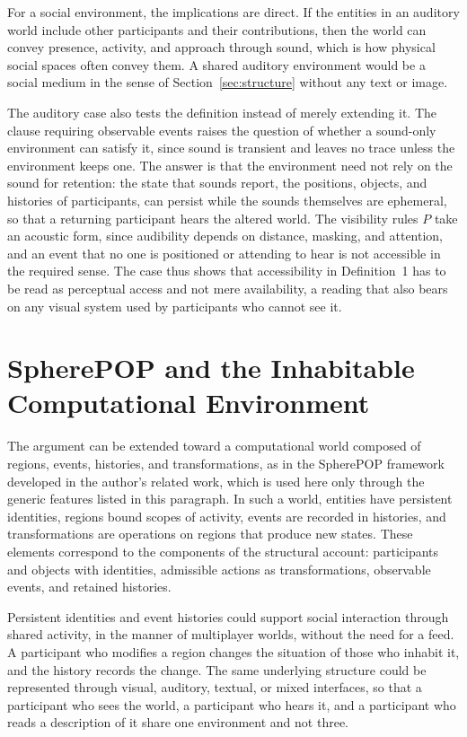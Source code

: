 \documentclass[11pt]{article}
\theoremstyle{remark}
\newcommand{\Pp}{P}
\begin{document}
For a social environment, the implications are direct. If the entities in an auditory world include other participants and their contributions, then the world can convey presence, activity, and approach through sound, which is how physical social spaces often convey them. A shared auditory environment would be a social medium in the sense of Section~\ref{sec:structure} without any text or image.

The auditory case also tests the definition instead of merely extending it. The clause requiring observable events raises the question of whether a sound-only environment can satisfy it, since sound is transient and leaves no trace unless the environment keeps one. The answer is that the environment need not rely on the sound for retention: the state that sounds report, the positions, objects, and histories of participants, can persist while the sounds themselves are ephemeral, so that a returning participant hears the altered world. The visibility rules $\Pp$ take an acoustic form, since audibility depends on distance, masking, and attention, and an event that no one is positioned or attending to hear is not accessible in the required sense. The case thus shows that accessibility in Definition~1 has to be read as perceptual access and not mere availability, a reading that also bears on any visual system used by participants who cannot see it.

\section{SpherePOP and the Inhabitable Computational Environment}

The argument can be extended toward a computational world composed of regions, events, histories, and transformations, as in the SpherePOP framework developed in the author's related work, which is used here only through the generic features listed in this paragraph. In such a world, entities have persistent identities, regions bound scopes of activity, events are recorded in histories, and transformations are operations on regions that produce new states. These elements correspond to the components of the structural account: participants and objects with identities, admissible actions as transformations, observable events, and retained histories.

Persistent identities and event histories could support social interaction through shared activity, in the manner of multiplayer worlds, without the need for a feed. A participant who modifies a region changes the situation of those who inhabit it, and the history records the change. The same underlying structure could be represented through visual, auditory, textual, or mixed interfaces, so that a participant who sees the world, a participant who hears it, and a participant who reads a description of it share one environment and not three.
\end{document}
